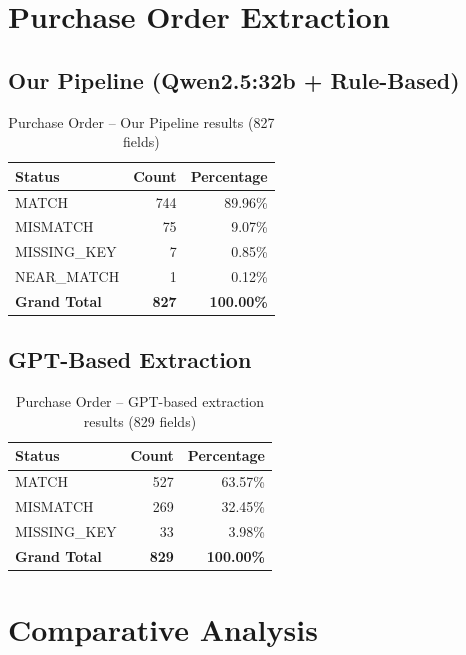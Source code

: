 \documentclass[12pt,a4paper]{report}
\begin{document}
\section{Purchase Order Extraction}

\subsection{Our Pipeline (Qwen2.5:32b + Rule-Based)}
\begin{table}[H]
\centering\sffamily
\begin{tabular}{l r r}
\toprule
\textbf{Status} & \textbf{Count} & \textbf{Percentage} \\
\midrule
\rowcolor{matchgreen} MATCH & 744 & 89.96\% \\
\rowcolor{misyellow} MISMATCH & 75 & 9.07\% \\
\rowcolor{missred!60} MISSING\_KEY & 7 & 0.85\% \\
\rowcolor{nearorange} NEAR\_MATCH & 1 & 0.12\% \\
\midrule
\textbf{Grand Total} & \textbf{827} & \textbf{100.00\%} \\
\bottomrule
\end{tabular}
\caption{Purchase Order -- Our Pipeline results (827 fields)}
\end{table}

\subsection{GPT-Based Extraction}
\begin{table}[H]
\centering\sffamily
\begin{tabular}{l r r}
\toprule
\textbf{Status} & \textbf{Count} & \textbf{Percentage} \\
\midrule
\rowcolor{matchgreen} MATCH & 527 & 63.57\% \\
\rowcolor{misyellow} MISMATCH & 269 & 32.45\% \\
\rowcolor{missred!60} MISSING\_KEY & 33 & 3.98\% \\
\midrule
\textbf{Grand Total} & \textbf{829} & \textbf{100.00\%} \\
\bottomrule
\end{tabular}
\caption{Purchase Order -- GPT-based extraction results (829 fields)}
\end{table}

\section{Comparative Analysis}
\end{document}

